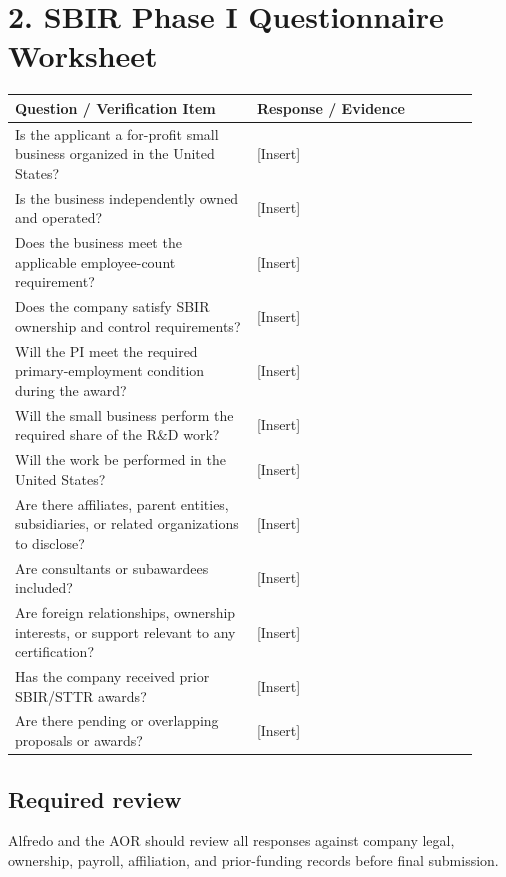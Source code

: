 \documentclass[11pt,letterpaper]{article}
\begin{document}
\section*{2. SBIR Phase I Questionnaire Worksheet}

\begin{longtable}{p{0.48\linewidth}p{0.44\linewidth}}
\textbf{Question / Verification Item} & \textbf{Response / Evidence} \\
\hline
Is the applicant a for-profit small business organized in the United States? & [Insert] \\
Is the business independently owned and operated? & [Insert] \\
Does the business meet the applicable employee-count requirement? & [Insert] \\
Does the company satisfy SBIR ownership and control requirements? & [Insert] \\
Will the PI meet the required primary-employment condition during the award? & [Insert] \\
Will the small business perform the required share of the R\&D work? & [Insert] \\
Will the work be performed in the United States? & [Insert] \\
Are there affiliates, parent entities, subsidiaries, or related organizations to disclose? & [Insert] \\
Are consultants or subawardees included? & [Insert] \\
Are foreign relationships, ownership interests, or support relevant to any certification? & [Insert] \\
Has the company received prior SBIR/STTR awards? & [Insert] \\
Are there pending or overlapping proposals or awards? & [Insert] \\
\end{longtable}

\subsection*{Required review}
Alfredo and the AOR should review all responses against company legal, ownership,
payroll, affiliation, and prior-funding records before final submission.
\end{document}
